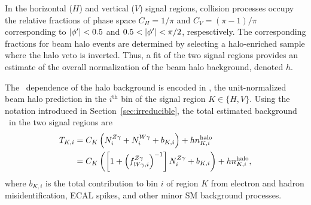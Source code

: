 In the horizontal ($H$) and vertical ($V$) signal regions, collision processes occupy the relative fractions of phase space $C_{H} = 1/\pi$ and $C_{V} = (\pi-1)/\pi$ corresponding to $\abs{\phi'} < 0.5$ and $0.5 < \abs{\phi'} < \pi/2$, respesctively. 
The corresponding fractions for beam halo events are determined by selecting a halo-enriched sample where the halo veto is inverted. 
Thus, a fit of the two signal regions provides an estimate of the overall normalization of the beam halo background, denoted $h$.
 
The \ETg\ dependence of the halo background is encoded in \nhalo[,i], the unit-normalized beam halo prediction in the $i^\mathrm{th}$ bin of the signal region $K \in \{H,V\}$.
Using the notation introduced in Section~\ref{sec:irreducible}, the total estimated background \TK\ in the two signal regions are
\begin{equation}
\begin{aligned}
  \TK[,i] & = C_{K} \left( \NZg[i] + \NWg[i] + b_{K,i}\right) + h \nhalo[,i]  \\
          & = C_{K} \left( \left[1 + \left(\fZW[,i]\right)^{-1}\right] \NZg[i] + b_{K,i}\right) + h \nhalo[,i],
\end{aligned}
\end{equation}
where $b_{K,i}$ is the total contribution to bin $i$ of region $K$ from electron and hadron misidentification, ECAL spikes, and other minor SM background processes.

